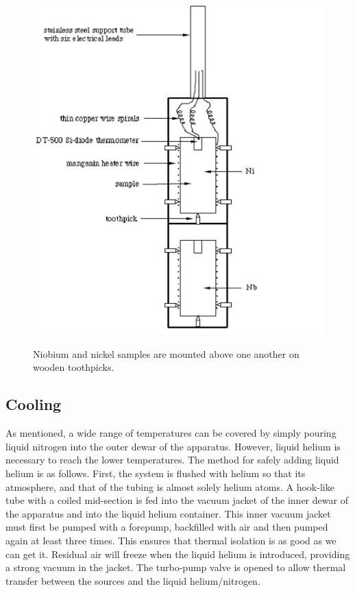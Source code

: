 \documentclass{article}
\begin{document}
\begin{figure}[!htb]
	\centering
	\includegraphics[scale=.75]{plots/apparatus.png}
 	\label{apparatus}
	\caption{Niobium and nickel samples are mounted above one another on wooden toothpicks. \cite{lab manual}}
\end{figure}

\subsection{Cooling}

As mentioned, a wide range of temperatures can be covered by simply pouring liquid nitrogen into the outer dewar of the apparatus. However, liquid helium is necessary to reach the lower temperatures. The method for safely adding liquid helium is as follows. First, the system is flushed with helium so that its atmosphere, and that of the tubing is almost solely helium atoms. A hook-like tube with a coiled mid-section is fed into the vacuum jacket of the inner dewar of the apparatus and into the liquid helium container. This inner vacuum jacket must first be pumped with a forepump, backfilled with air and then pumped again at least three times. This ensures that thermal isolation is as good as we can get it. Residual air will freeze when the liquid helium is introduced, providing a strong vacuum in the jacket. The turbo-pump valve is opened to allow thermal transfer between the sources and the liquid helium/nitrogen.
\end{document}
